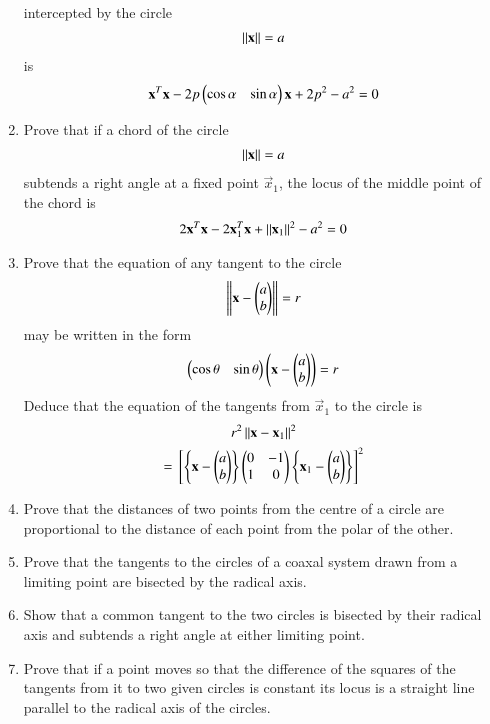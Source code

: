 \begin{enumerate}[label=\arabic*.,ref=\thesubsection.\theenumi]
\begin{align}
\end{align}
 intercepted by the circle 
\begin{align}
\left\lVert\mathbf{x}\right\rVert = a
\end{align}
 is
\begin{align}
\mathbf{x}^T\mathbf{x}-2p\begin{pmatrix}\cos\alpha & \sin\alpha\end{pmatrix}\mathbf{x}+2p^2-a^2 = 0
\end{align}
\item Prove that if a chord of the circle 
\begin{align}
\left\lVert\mathbf{x}\right\rVert = a
\end{align}
subtends a right angle at a fixed point $\vec{x}_1$, the locus of the middle point
of the chord is
\begin{align}
2\mathbf{x}^T\mathbf{x}-2\mathbf{x}_1^T\mathbf{x}+\left\lVert\mathbf{x}_1\right\rVert^2 - a^2  = 0
\end{align}
\item Prove that the equation of any tangent to the circle
\begin{align}
\left\lVert\mathbf{x}-\begin{pmatrix}a\\b\end{pmatrix}\right\rVert = r
\end{align}
may be written in the form
\begin{align}
\begin{pmatrix}\cos\theta & \sin\theta\end{pmatrix}\left(\mathbf{x}-\begin{pmatrix}a\\b\end{pmatrix}\right) = r
\end{align}
Deduce that the equation of the tangents from $\vec{x}_1$ to the circle is
\begin{multline}
r^2\left\lVert\mathbf{x}-\mathbf{x}_1\right\rVert^2
\\
 ={}\left[\left\{\mathbf{x}-\begin{pmatrix}a\\b\end{pmatrix}\right\}\begin{pmatrix}0 & -1\\1 & 0\end{pmatrix}\left\{\mathbf{x}_1-\begin{pmatrix}a\\b\end{pmatrix}\right\}\right]^2
\end{multline}
\item Prove that the distances of two points from the centre of a circle are proportional to the distance of each point from the polar of the
other.
\item Prove that the tangents to the circles of a coaxal system drawn from a limiting point are bisected by
the radical axis.
\item Show that a common tangent to the two circles is bisected by their radical axis and subtends a right angle at either limiting point.
\item Prove that if a point moves so that the difference of the squares of the tangents from it to two given circles is constant its locus
 is a straight line parallel to the radical axis of the circles.

\end{enumerate}

